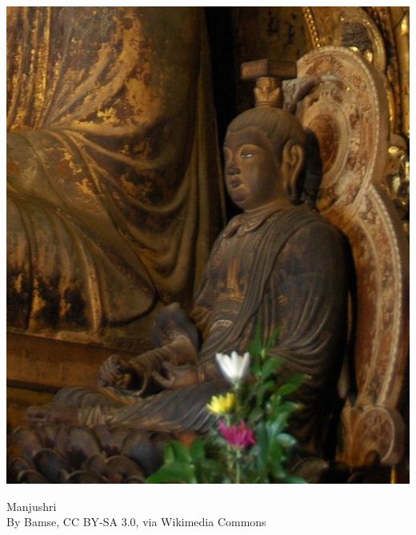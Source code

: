 \documentclass{article}
\begin{document}
\begin{multicols}{4}
\begin{center}
\vfill~
\columnbreak
~\vfill

\includegraphics[width=\columnwidth]{Images/Eastern_Golden_Hall_Kofukuji_Monju_Bosatsu.jpg}

{\small Manjushri\\
\scriptsize By Bamse, CC BY-SA 3.0, via Wikimedia Commons\par}

\vfill~
\columnbreak
~\vfill


\end{center}
\end{multicols}
\end{document}
